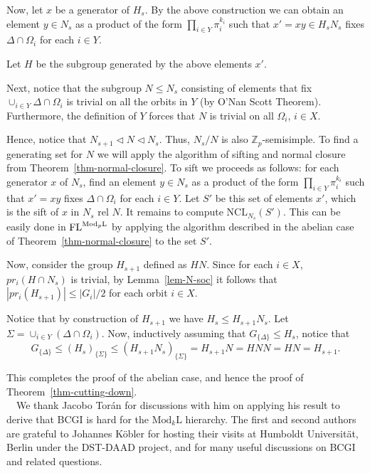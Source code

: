 \documentclass[11pt]{article}
\newcommand{\Mod}[1]{\ensuremath{\mathrm{Mod}_{#1}\mathrm{L}}}
\newcommand{\FL}{\mbox{\rm FL}}
\newcommand{\NCL}[2]{\ensuremath{\mathrm{NCL}_{#1}({#2})}}
\newcommand{\Z}{\mathbb{Z}}
\newcommand{\pr}[2]{\ensuremath{pr_{#1}\left({#2}\right)}}
\begin{document}
Now, let $x$ be a generator of $H_s$. By the above construction we
can obtain an element $y\in N_s$ as a product of the form $\prod_{i\in
Y}\pi_i^{k_i}$ such that $x'=xy\in H_sN_s$ fixes $\Delta\cap
\Omega_i$ for each $i\in Y$.

Let $H$ be the subgroup generated by the above elements $x'$.

Next, notice that the subgroup $N\leq N_s$ consisting of elements that
fix $\cup_{i\in Y}\Delta\cap\Omega_i$ is trivial on all the orbits in
$Y$ (by O'Nan Scott Theorem). Furthermore, the definition of $Y$
forces that $N$ is trivial on all $\Omega_i$, $i\in X$. 

Hence, notice that $N_{s+1}\lhd N\lhd N_s$. Thus, $N_s/N$ is also
$\Z_p$-semisimple. To find a generating set for $N$ we will apply the
algorithm of sifting and normal closure from
Theorem~\ref{thm-normal-closure}. To sift we proceeds as follows: for
each generator $x$ of $N_s$, find an element $y\in N_s$ as a product
of the form $\prod_{i\in Y}\pi_i^{k_i}$ such that $x'=xy$ fixes
$\Delta\cap \Omega_i$ for each $i\in Y$. Let $S'$ be this set of
elements $x'$, which is the sift of $x$ in $N_s$ rel $N$. It remains
to compute $\NCL{N_s}{S'}$. This can be easily done in $\FL^{\Mod{p}}$
by applying the algorithm described in the abelian case of
Theorem~\ref{thm-normal-closure} to the set $S'$.

Now, consider the group $H_{s+1}$ defined as $HN$. Since for each
$i\in X$, $\pr{i}{H\cap N_s}$ is trivial, by Lemma~\ref{lem-N-soc} it
follows that $|\pr{i}{H_{s+1}}|\leq |G_i|/2$ for each orbit $i\in X$.

Notice that by construction of $H_{s+1}$ we have $H_s\leq
H_{s+1}N_s$. Let $\Sigma=\cup_{i\in Y}(\Delta\cap\Omega_i)$. Now,
inductively assuming that $G_{\{\Delta\}}\leq H_s$, notice that
\[
G_{\{\Delta\}}\leq (H_s)_{\{\Sigma\}}\leq
(H_{s+1}N_s)_{\{\Sigma\}}=H_{s+1}N=HNN=HN=H_{s+1}.
\]

This completes the proof of the abelian case, and hence the proof of
Theorem~\ref{thm-cutting-down}.\\

~~We thank Jacobo Tor\'an for
discussions with him on applying his result \cite[Lemma 4.7]{tor} to
derive that BCGI is hard for the $\Mod{k}$ hierarchy. The first and
second authors are grateful to Johannes K\"obler for hosting their
visits at Humboldt Universit\"at, Berlin under the DST-DAAD project,
and for many useful discussions on BCGI and related questions.
\end{document}

